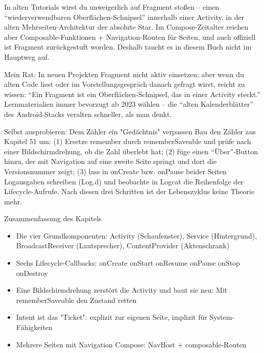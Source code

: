 
In alten Tutorials wirst du unweigerlich auf Fragment stoßen – einen “wiederverwendbaren Oberflächen-Schnipsel” innerhalb einer Activity, in der alten Mehrseiten-Architektur der absolute Star. Im Compose-Zeitalter reichen aber Composable-Funktionen + Navigation-Routen für Seiten, und auch offiziell ist Fragment zurückgestuft worden. Deshalb taucht es in diesem Buch nicht im Hauptweg auf.

Mein Rat: In neuen Projekten Fragment nicht aktiv einsetzen; aber wenn du alten Code liest oder im Vorstellungsgespräch danach gefragt wirst, reicht zu wissen: “Ein Fragment ist ein Oberflächen-Schnipsel, das in einer Activity steckt.” Lernmaterialien immer bevorzugt ab 2023 wählen – die “alten Kalenderblätter” des Android-Stacks veralten schneller, als man denkt.

\begin{tcbpractice}{Selbst ausprobieren: Dem Zähler ein "Gedächtnis" verpassen}
Bau den Zähler aus Kapitel 51 um: (1) Ersetze remember durch rememberSaveable und prüfe nach einer Bildschirmdrehung, ob die Zahl überlebt hat; (2) füge einen “Über”-Button hinzu, der mit Navigation auf eine zweite Seite springt und dort die Versionsnummer zeigt; (3) lass in onCreate bzw. onPause beider Seiten Logausgaben schreiben (Log.d) und beobachte in Logcat die Reihenfolge der Lifecycle-Aufrufe. Nach diesen drei Schritten ist der Lebenszyklus keine Theorie mehr.

\end{tcbpractice}

\begin{tcbsummary}{Zusammenfassung des Kapitels}
\begin{itemize}
  \item Die vier Grundkomponenten: Activity (Schaufenster), Service (Hintergrund), BroadcastReceiver (Lautsprecher), ContentProvider (Aktenschrank)
  \item Sechs Lifecycle-Callbacks: onCreate onStart onResume onPause onStop onDestroy
  \item Eine Bildschirmdrehung zerstört die Activity und baut sie neu: Mit rememberSaveable den Zustand retten
  \item Intent ist das "Ticket": explizit zur eigenen Seite, implizit für System-Fähigkeiten
  \item Mehrere Seiten mit Navigation Compose: NavHost + composable-Routen
\end{itemize}

\end{tcbsummary}
